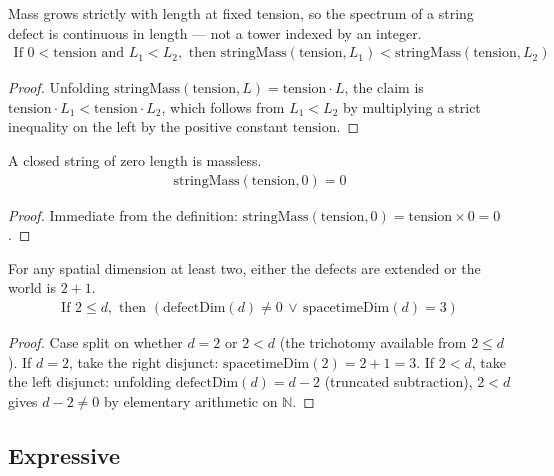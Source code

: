 \begin{theorem}
Mass grows strictly with length at fixed tension, so the spectrum of a string defect is continuous in length — not a tower indexed by an integer.
\begin{align*}
\text{If } 0 < \text{tension} \text{ and } L_1 < L_2, \text{ then } \text{stringMass}(\text{tension}, L_1) < \text{stringMass}(\text{tension}, L_2)
\end{align*}
\begin{proof}
Unfolding $\text{stringMass}(\text{tension},L)=\text{tension}\cdot L$, the claim is $\text{tension}\cdot L_1 < \text{tension}\cdot L_2$, which follows from $L_1<L_2$ by multiplying a strict inequality on the left by the positive constant $\text{tension}$.
\end{proof}
\end{theorem}

\begin{proposition}
A closed string of zero length is massless.
\begin{align*}
\text{stringMass}(\text{tension}, 0) = 0
\end{align*}
\begin{proof}
Immediate from the definition: $\text{stringMass}(\text{tension},0) = \text{tension}\times0 = 0$.
\end{proof}
\end{proposition}

\begin{theorem}
For any spatial dimension at least two, either the defects are extended or the world is $2+1$.
\begin{align*}
\text{If } 2 \le d, \text{ then } (\text{defectDim}(d) \neq 0 \,\vee\, \text{spacetimeDim}(d) = 3)
\end{align*}
\begin{proof}
Case split on whether $d=2$ or $2<d$ (the trichotomy available from $2\leq d$). If $d=2$, take the right disjunct: $\text{spacetimeDim}(2)=2+1=3$. If $2<d$, take the left disjunct: unfolding $\text{defectDim}(d)=d-2$ (truncated subtraction), $2<d$ gives $d-2\neq0$ by elementary arithmetic on $\mathbb{N}$.
\end{proof}
\end{theorem}

\subsection{Expressive}

